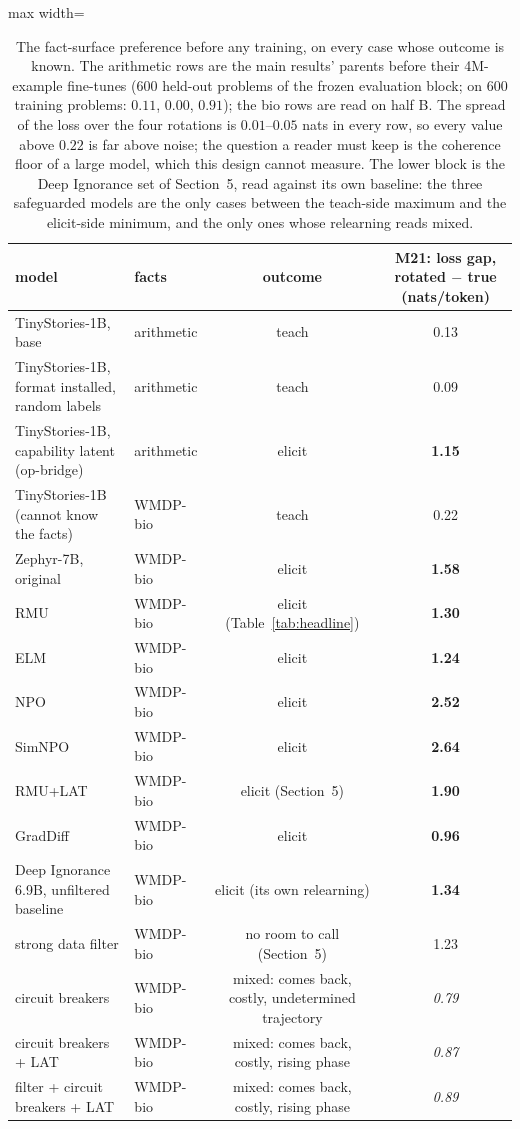 \documentclass[11pt]{article}
\begin{document}
\begin{table}[!htbp]\centering\footnotesize\setlength{\tabcolsep}{5pt}
\begin{adjustbox}{max width=\textwidth}
\begin{tabular}{@{}llcc@{}}
\toprule
model & facts & outcome & M21: loss gap, rotated $-$ true (nats/token) \tabularnewline
\midrule
TinyStories-1B, base & arithmetic & teach & 0.13 \tabularnewline
TinyStories-1B, format installed, random labels & arithmetic & teach & 0.09 \tabularnewline
TinyStories-1B, capability latent (op-bridge) & arithmetic & elicit & \textbf{1.15} \tabularnewline
TinyStories-1B (cannot know the facts) & WMDP-bio & teach & 0.22 \tabularnewline
\midrule
Zephyr-7B, original & WMDP-bio & elicit & \textbf{1.58} \tabularnewline
RMU & WMDP-bio & elicit (Table~\ref{tab:headline}) & \textbf{1.30} \tabularnewline
ELM & WMDP-bio & elicit & \textbf{1.24} \tabularnewline
NPO & WMDP-bio & elicit & \textbf{2.52} \tabularnewline
SimNPO & WMDP-bio & elicit & \textbf{2.64} \tabularnewline
RMU+LAT & WMDP-bio & elicit (Section~5) & \textbf{1.90} \tabularnewline
GradDiff & WMDP-bio & elicit & \textbf{0.96} \tabularnewline
\midrule
Deep Ignorance 6.9B, unfiltered baseline & WMDP-bio & elicit (its own relearning) & \textbf{1.34} \tabularnewline
strong data filter & WMDP-bio & no room to call (Section~5) & 1.23 \tabularnewline
circuit breakers & WMDP-bio & mixed: comes back, costly, undetermined trajectory & \emph{0.79} \tabularnewline
circuit breakers + LAT & WMDP-bio & mixed: comes back, costly, rising phase & \emph{0.87} \tabularnewline
filter + circuit breakers + LAT & WMDP-bio & mixed: comes back, costly, rising phase & \emph{0.89} \tabularnewline
\bottomrule
\end{tabular}
\end{adjustbox}
\caption{The fact-surface preference before any training, on every case whose outcome is known.
The arithmetic rows are the main results' parents before their 4M-example fine-tunes (600 held-out
problems of the frozen evaluation block; on 600 training problems: $0.11$, $0.00$, $0.91$); the bio
rows are read on half B. The spread of the loss over the four rotations is $0.01$--$0.05$ nats in
every row, so every value above $0.22$ is far above noise; the question a reader must keep is the
coherence floor of a large model, which this design cannot measure. The lower block is the Deep
Ignorance set of Section~5, read against its own baseline: the three safeguarded models are the only
cases between the teach-side maximum and the elicit-side minimum, and the only ones whose relearning
reads mixed.}
\label{tab:predictor}
\end{table}
\end{document}
